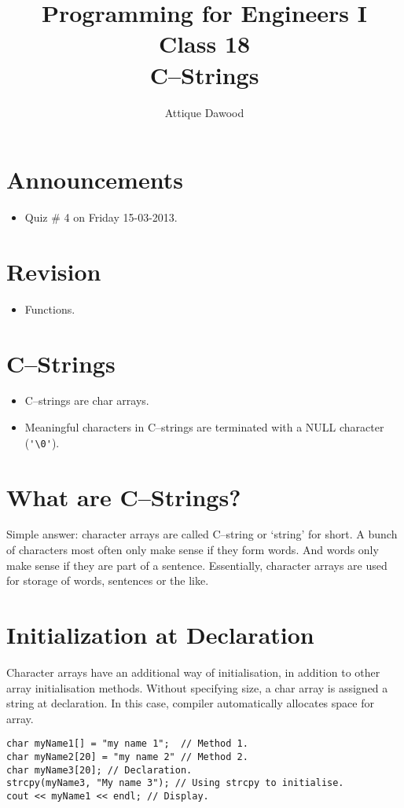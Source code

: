 \documentclass[12pt,a4paper]{article}
\title{\vspace{-2cm}Programming for Engineers I\\Class 18\\C--Strings}
\author{Attique Dawood}
\begin{document}
\maketitle
\section{Announcements}
\begin{itemize}
\item Quiz \# 4 on Friday 15-03-2013.
\end{itemize}
\section{Revision}
\begin{itemize}
\item Functions.
\end{itemize}
\section{C--Strings}
\begin{itemize}
\item C--strings are char arrays.
\item Meaningful characters in C--strings are terminated with a NULL character (\verb|'\0'|).
\end{itemize}
\section{What are C--Strings?}
Simple answer: character arrays are called C--string or `string' for short. A bunch of characters most often only make sense if they form words. And words only make sense if they are part of a sentence. Essentially, character arrays are used for storage of words, sentences or the like.
\section{Initialization at Declaration}
Character arrays have an additional way of initialisation, in addition to other array initialisation methods. Without specifying size, a char array is assigned a string at declaration. In this case, compiler automatically allocates space for array.
\begin{lstlisting}[caption={Initialisation of C--Strings}]
char myName1[] = "my name 1";  // Method 1.
char myName2[20] = "my name 2" // Method 2.
char myName3[20]; // Declaration.
strcpy(myName3, "My name 3"); // Using strcpy to initialise.
cout << myName1 << endl; // Display.
\end{lstlisting}
\end{document}
